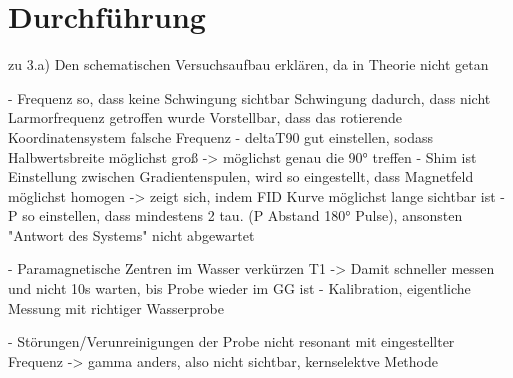 \newpage
\section{Durchführung}
\label{sec:Durchführung}

zu 3.a) Den schematischen Versuchsaufbau erklären, da in Theorie nicht getan

- Frequenz so, dass keine Schwingung sichtbar
  Schwingung dadurch, dass nicht Larmorfrequenz getroffen wurde
  Vorstellbar, dass das rotierende Koordinatensystem falsche Frequenz
- deltaT90 gut einstellen, sodass Halbwertsbreite möglichst groß
  -> möglichst genau die 90° treffen
- Shim ist Einstellung zwischen Gradientenspulen, wird so eingestellt,
  dass Magnetfeld möglichst homogen
  -> zeigt sich, indem FID Kurve möglichst lange sichtbar ist
- P so einstellen, dass mindestens 2 tau. (P Abstand 180° Pulse),
  ansonsten "Antwort des Systems" nicht abgewartet


- Paramagnetische Zentren im Wasser verkürzen T1
  -> Damit schneller messen und nicht 10s warten, bis Probe wieder im GG ist
  - Kalibration, eigentliche Messung mit richtiger Wasserprobe

- Störungen/Verunreinigungen der Probe nicht resonant mit eingestellter Frequenz
  -> gamma anders, also nicht sichtbar, kernselektve Methode
